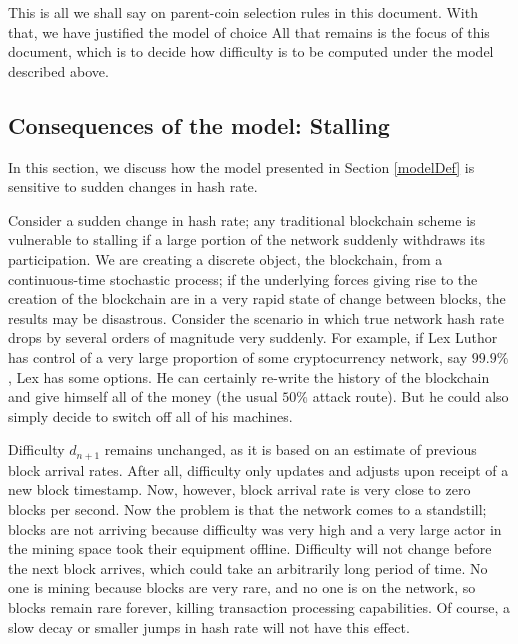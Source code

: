 \documentclass[12pt,english]{mrl}
\theoremstyle{definition}
\numberwithin{equation}{section}
\numberwithin{figure}{section}
\numberwithin{equation}{section}
\numberwithin{equation}{section}
\numberwithin{figure}{section}
\begin{document}
This is all we shall say on parent-coin selection rules in this document. With that, we have justified the model of choice  All that remains is the focus of this document, which is to decide how difficulty is to be computed under the model described above.

\subsection{Consequences of the model: Stalling}\label{hashrateattack}

In this section, we discuss how the model presented in Section \ref{modelDef} is sensitive to sudden changes in hash rate.

Consider a sudden change in hash rate; any traditional blockchain scheme is vulnerable to stalling if a large portion of the network suddenly withdraws its participation. We are creating a discrete object, the blockchain, from a continuous-time stochastic process; if the underlying forces giving rise to the creation of the blockchain are in a very rapid state of change between blocks, the results may be disastrous. Consider the scenario in which true network hash rate drops by several orders of magnitude very suddenly. For example, if Lex Luthor has control of a very large proportion of some cryptocurrency network, say $99.9\%$, Lex has some options. He can certainly re-write the history of the blockchain and give himself all of the money (the usual $50\%$ attack route). But he could also simply decide to switch off all of his machines.

Difficulty $d_{n+1}$ remains unchanged, as it is based on an estimate of previous block arrival rates. After all, difficulty only updates and adjusts upon receipt of a new block timestamp. Now, however, block arrival rate is very close to zero blocks per second. Now the problem is that the network comes to a standstill; blocks are not arriving because difficulty was very high and a very large actor in the mining space took their equipment offline. Difficulty will not change before the next block arrives, which could take an arbitrarily long period of time. No one is mining because blocks are very rare, and no one is on the network, so blocks remain rare forever, killing transaction processing capabilities. Of course, a slow decay or smaller jumps in hash rate will not have this effect. 
\end{document}
